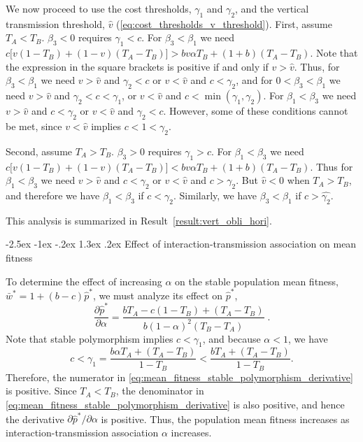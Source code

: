 \documentclass[12pt]{extarticle}
\makeatletter
\renewcommand\section{\@startsection {section}{1}{\z@}%
     {-2.5ex \@plus -1ex \@minus -.2ex}%
     {1.3ex \@plus.2ex}%
    {\Large\bfseries}}
\makeatother
\begin{document}
{\begin{appendices}
We now proceed to use the cost thresholds, $\gamma_1$ and $\gamma_2$, and the vertical transmission threshold, $\hat v$ (\autoref{eq:cost_thresholds_v_threshold}).
First, assume $T_A<T_B$.
$\beta_3<0$ requires $\gamma_1<c$.
For $\beta_3<\beta_1$ we need $c\big[v(1-T_B) + (1-v)(T_A-T_B)\big] > bv\alpha T_B + (1+b)(T_A-T_B)$.
Note that the expression in the square brackets is positive if and only if $v > \hat v$.
Thus, for $\beta_3<\beta_1$ we need $v > \hat v$ and $\gamma_2 < c$ or $v < \hat v$ and $c < \gamma_2$,
and for $0<\beta_3<\beta_1$ we need $v > \hat v$ and $\gamma_2 < c < \gamma_1$, or $v < \hat v$ and $c < \min(\gamma_1, \gamma_2)$. For $\beta_1<\beta_3$ we need $v > \hat v$ and $c<\gamma_2$ or $v < \hat v$ and $\gamma_2<c$.
However, some of these conditions cannot be met, since $v < \hat v$ implies $c<1<\gamma_2$.

Second, assume $T_A>T_B$.
$\beta_3>0$ requires $\gamma_1 > c$. 
For $\beta_1<\beta_3$ we need $c\big[v(1-T_B) + (1-v)(T_A-T_B)\big] < bv\alpha T_B + (1+b)(T_A-T_B)$.
Thus for $\beta_1<\beta_3$ we need $v > \hat v$ and $c < \gamma_2 $ or $v < \hat v$ and $c > \gamma_2$.
But $\hat{v}<0$ when $T_A > T_B$, and therefore we have $\beta_1<\beta_3$ if $c < \gamma_2$. Similarly, we have $\beta_3<\beta_1$ if $c > \hat{\gamma_2}$.

This analysis is summarized in Result~\ref{result:vert_obli_hori}.

\section{Effect of interaction-transmission association on mean fitness} \label{sec:appendixC}

To determine the effect of increasing $\alpha$ on the stable population mean fitness, $\bar{w}^*=1+(b-c)\hat{p}^*$, we must analyze its effect on $\hat{p}^*$, 
\begin{equation} \label{eq:mean_fitness_stable_polymorphism_derivative}
  \frac{\partial \hat{p}^*}{\partial \alpha} 
  = \frac{b T_A - c(1-T_B) + (T_A-T_B)}{b (1-\alpha)^2 (T_B-T_A)} \;.
\end{equation} 
Note that stable polymorphism implies $c<\gamma_1$, and because $\alpha<1$, we have
\begin{equation}
c < \gamma_1 = \frac{b \alpha T_A + (T_A-T_B)}{1-T_B} < \frac{b T_A + (T_A-T_B)}{1-T_B}.
\end{equation} 
Therefore, the numerator in \autoref{eq:mean_fitness_stable_polymorphism_derivative} is positive.
Since $T_A<T_B$, the denominator in \autoref{eq:mean_fitness_stable_polymorphism_derivative} is also positive, and hence the derivative $\partial \hat{p}^* / \partial \alpha$ is positive.
Thus, the population mean fitness increases as interaction-transmission association $\alpha$ increases.


\end{appendices}}
\end{document}
